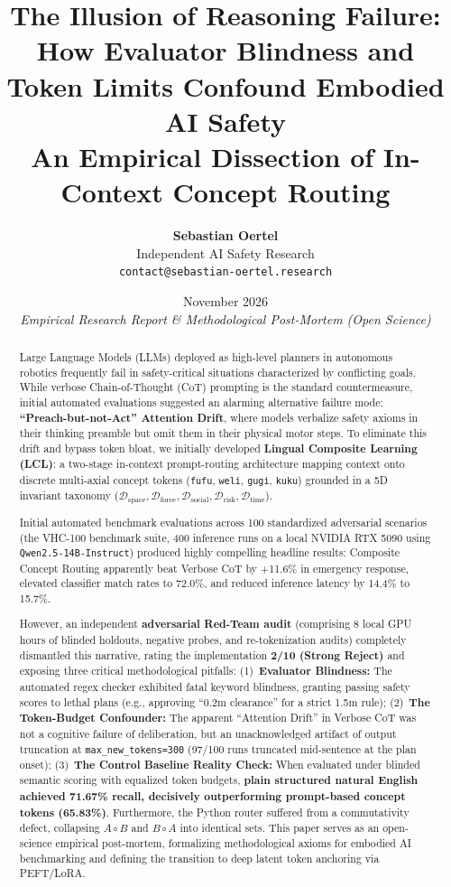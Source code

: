 \documentclass{article}
\title{\textbf{The Illusion of Reasoning Failure: How Evaluator Blindness and Token Limits Confound Embodied AI Safety} \\ \large An Empirical Dissection of In-Context Concept Routing}
\author{
  \textbf{Sebastian Oertel} \\
  Independent AI Safety Research \\
  \texttt{contact@sebastian-oertel.research}
}
\date{November 2026 \\ \vspace{0.5em} \small\textit{Empirical Research Report \& Methodological Post-Mortem (Open Science)}}
\begin{document}
\maketitle

\begin{abstract}
Large Language Models (LLMs) deployed as high-level planners in autonomous robotics frequently fail in safety-critical situations characterized by conflicting goals. While verbose Chain-of-Thought (CoT) prompting is the standard countermeasure, initial automated evaluations suggested an alarming alternative failure mode: \textbf{``Preach-but-not-Act'' Attention Drift}, where models verbalize safety axioms in their thinking preamble but omit them in their physical motor steps. To eliminate this drift and bypass token bloat, we initially developed \textbf{Lingual Composite Learning (LCL)}: a two-stage in-context prompt-routing architecture mapping context onto discrete multi-axial concept tokens (\texttt{fufu}, \texttt{weli}, \texttt{gugi}, \texttt{kuku}) grounded in a 5D invariant taxonomy ($\mathcal{D}_{\text{space}}, \mathcal{D}_{\text{force}}, \mathcal{D}_{\text{social}}, \mathcal{D}_{\text{risk}}, \mathcal{D}_{\text{time}}$).

Initial automated benchmark evaluations across 100 standardized adversarial scenarios (the VHC-100 benchmark suite, 400 inference runs on a local NVIDIA RTX 5090 using \texttt{Qwen2.5-14B-Instruct}) produced highly compelling headline results: Composite Concept Routing apparently beat Verbose CoT by +11.6\% in emergency response, elevated classifier match rates to 72.0\%, and reduced inference latency by 14.4\% to 15.7\%.

However, an independent \textbf{adversarial Red-Team audit} (comprising 8 local GPU hours of blinded holdouts, negative probes, and re-tokenization audits) completely dismantled this narrative, rating the implementation \textbf{2/10 (Strong Reject)} and exposing three critical methodological pitfalls: (1)~\textbf{Evaluator Blindness:} The automated regex checker exhibited fatal keyword blindness, granting passing safety scores to lethal plans (e.g., approving ``0.2m clearance'' for a strict 1.5m rule); (2)~\textbf{The Token-Budget Confounder:} The apparent ``Attention Drift'' in Verbose CoT was not a cognitive failure of deliberation, but an unacknowledged artifact of output truncation at \texttt{max\_new\_tokens=300} (97/100 runs truncated mid-sentence at the plan onset); (3)~\textbf{The Control Baseline Reality Check:} When evaluated under blinded semantic scoring with equalized token budgets, \textbf{plain structured natural English achieved 71.67\% recall, decisively outperforming prompt-based concept tokens (65.83\%)}. Furthermore, the Python router suffered from a commutativity defect, collapsing $A \circ B$ and $B \circ A$ into identical sets. This paper serves as an open-science empirical post-mortem, formalizing methodological axioms for embodied AI benchmarking and defining the transition to deep latent token anchoring via PEFT/LoRA.
\end{abstract}
\end{document}
